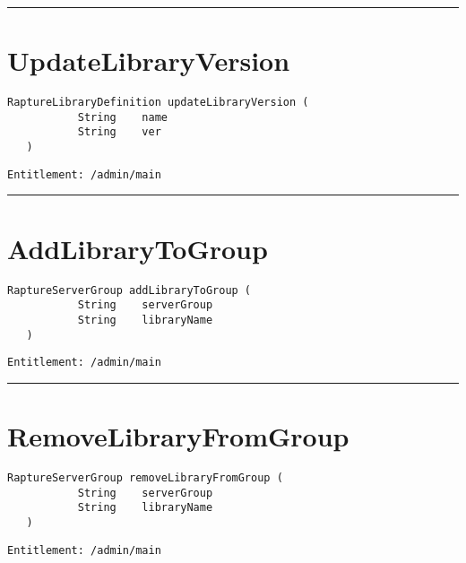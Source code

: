 \rule{12cm}{2pt}
\section{UpdateLibraryVersion}
\label{Api:UpdateLibraryVersion}
\begin{lstlisting}[style=nonumbers]
   RaptureLibraryDefinition updateLibraryVersion (
           String    name
           String    ver
   )
\end{lstlisting}
\begin{Verbatim}[formatcom=\color{Maroon}]
  Entitlement: /admin/main
\end{Verbatim}



\rule{12cm}{2pt}
\section{AddLibraryToGroup}
\label{Api:AddLibraryToGroup}
\begin{lstlisting}[style=nonumbers]
   RaptureServerGroup addLibraryToGroup (
           String    serverGroup
           String    libraryName
   )
\end{lstlisting}
\begin{Verbatim}[formatcom=\color{Maroon}]
  Entitlement: /admin/main
\end{Verbatim}



\rule{12cm}{2pt}
\section{RemoveLibraryFromGroup}
\label{Api:RemoveLibraryFromGroup}
\begin{lstlisting}[style=nonumbers]
   RaptureServerGroup removeLibraryFromGroup (
           String    serverGroup
           String    libraryName
   )
\end{lstlisting}
\begin{Verbatim}[formatcom=\color{Maroon}]
  Entitlement: /admin/main
\end{Verbatim}



